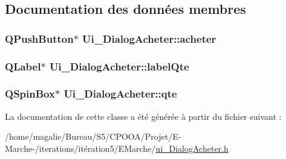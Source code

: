 \subsection{Documentation des données membres}
\hypertarget{class_ui___dialog_acheter_af6b53b197038b75c9c93a5a2bd7775a4}{
\subsubsection[{acheter}]{\setlength{\rightskip}{0pt plus 5cm}Q\-Push\-Button$\ast$ Ui\-\_\-\-Dialog\-Acheter\-::acheter}}\label{class_ui___dialog_acheter_af6b53b197038b75c9c93a5a2bd7775a4}
\hypertarget{class_ui___dialog_acheter_adfd72bae8a9c183780299127920f4438}{
\subsubsection[{label\-Qte}]{\setlength{\rightskip}{0pt plus 5cm}Q\-Label$\ast$ Ui\-\_\-\-Dialog\-Acheter\-::label\-Qte}}\label{class_ui___dialog_acheter_adfd72bae8a9c183780299127920f4438}
\hypertarget{class_ui___dialog_acheter_a21affb75243ff68116a045006c8ac3f6}{
\subsubsection[{qte}]{\setlength{\rightskip}{0pt plus 5cm}Q\-Spin\-Box$\ast$ Ui\-\_\-\-Dialog\-Acheter\-::qte}}\label{class_ui___dialog_acheter_a21affb75243ff68116a045006c8ac3f6}


La documentation de cette classe a été générée à partir du fichier suivant \-:\begin{DoxyCompactItemize}
\item 
/home/magalie/\-Bureau/\-S5/\-C\-P\-O\-O\-A/\-Projet/\-E-\/\-Marche-\//iterations/itération5/\-E\-Marche/\hyperlink{ui___dialog_acheter_8h}{ui\-\_\-\-Dialog\-Acheter.\-h}\end{DoxyCompactItemize}
